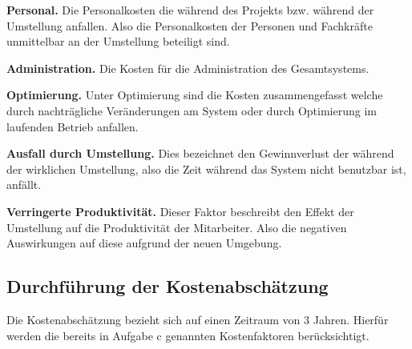 \documentclass[12pt,utf8]{scrartcl}
\begin{document}
\textbf{Personal.} Die Personalkosten die während des Projekts bzw. während der Umstellung anfallen. Also die Personalkosten der Personen und Fachkräfte unmittelbar an der Umstellung beteiligt sind.
\newline

\textbf{Administration.} Die Kosten für die Administration des Gesamtsystems.
\newline

\textbf{Optimierung.} Unter Optimierung sind die Kosten zusammengefasst welche durch nachträgliche Veränderungen am System oder durch Optimierung im laufenden Betrieb anfallen.
\newline

\textbf{Ausfall durch Umstellung.} Dies bezeichnet den Gewinnverlust der während der wirklichen Umstellung, also die Zeit während das System nicht benutzbar ist, anfällt.
\newline

\textbf{Verringerte Produktivität.} Dieser Faktor beschreibt den Effekt der Umstellung auf die Produktivität der Mitarbeiter. Also die negativen Auswirkungen auf diese aufgrund der neuen Umgebung.
\newpage

\subsection*{Durchführung der Kostenabschätzung}

Die Kostenabschätzung bezieht sich auf einen Zeitraum von 3 Jahren. Hierfür werden die bereits in Aufgabe c genannten Kostenfaktoren berücksichtigt.
\end{document}
